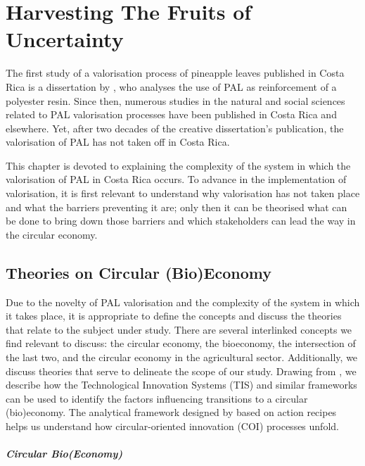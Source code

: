 \chapter{Harvesting The Fruits of Uncertainty}
\label{chapter_3lab}

The first study of a valorisation process of pineapple leaves published in Costa Rica is a dissertation by \citep{quesada2003utilizacion}, who analyses the use of PAL as reinforcement of a polyester resin. Since then, numerous studies in the natural and social sciences related to PAL valorisation processes have been published in Costa Rica and elsewhere. Yet, after two decades of the creative dissertation's publication, the valorisation of PAL has not taken off in Costa Rica. 

This chapter is devoted to explaining the complexity of the system in which the valorisation of PAL in Costa Rica occurs. To advance in the implementation of valorisation, it is first relevant to understand why valorisation has not taken place and what the barriers preventing it are; only then it can be theorised what can be done to bring down those barriers and which stakeholders can lead the way in the circular economy.

\section{Theories on Circular (Bio)Economy}
\label{theoryframe}

 Due to the novelty of PAL valorisation and the complexity of the system in which it takes place, it is appropriate to define the concepts and discuss the theories that relate to the subject under study. There are several interlinked concepts we find relevant to discuss: the circular economy, the bioeconomy, the intersection of the last two, and the circular economy in the agricultural sector. Additionally, we discuss theories that serve to delineate the scope of our study.  Drawing from \cite{gottinger2020studying}, we describe how the Technological Innovation Systems (TIS) and similar frameworks can be used to identify the factors influencing transitions to a circular (bio)economy. The analytical framework designed by \cite{blomsma2022making} based on action recipes helps us understand how circular-oriented innovation (COI) processes unfold.

\paragraph{Circular Bio(Economy)} \mbox{}\\

